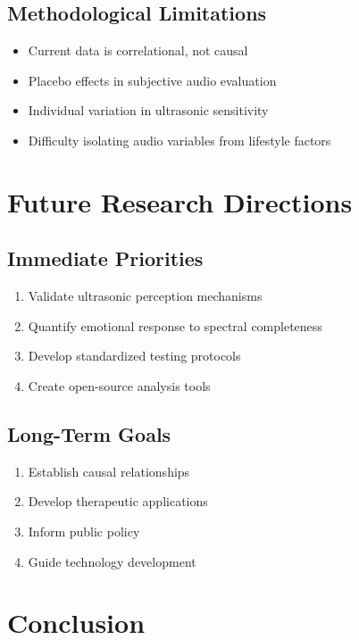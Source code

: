 \documentclass[12pt,a4paper]{article}
\begin{document}
\subsection{Methodological Limitations}

\begin{itemize}
\item Current data is correlational, not causal
\item Placebo effects in subjective audio evaluation
\item Individual variation in ultrasonic sensitivity
\item Difficulty isolating audio variables from lifestyle factors
\end{itemize}

\section{Future Research Directions}

\subsection{Immediate Priorities}

\begin{enumerate}
\item Validate ultrasonic perception mechanisms
\item Quantify emotional response to spectral completeness
\item Develop standardized testing protocols
\item Create open-source analysis tools
\end{enumerate}

\subsection{Long-Term Goals}

\begin{enumerate}
\item Establish causal relationships
\item Develop therapeutic applications
\item Inform public policy
\item Guide technology development
\end{enumerate}

\section{Conclusion}
\end{document}
